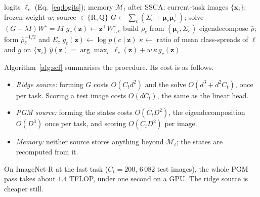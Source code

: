 \begin{algorithm}[t]
\caption{Statistics--classifier fusion at stage $t$ (inference only)}
\label{alg:scf}
\begin{algorithmic}[1]
\Require logits $\ell_c$ (Eq.~\ref{eq:logits}); memory $\mathcal M_t$ after SSCA;
  current-task images $\{\mathbf x_i\}$; frozen weight $w$; source $\in\{\mathrm R,\mathrm Q\}$
  \State $G\gets\sum_c(\Sigma_c+\boldsymbol\mu_c\boldsymbol\mu_c^{\top})$; solve $(G+\lambda I)W^\star=M$ 
  \State $g_c(\mathbf z)\gets\mathbf z^{\top}W^\star_{:,c}$
\Else
  \State build $\rho_c$ from $(\boldsymbol\mu_c,\Sigma_c)$ 
  \State eigendecompose $\bar\rho$; form $\bar\rho_\delta^{-1/2}$ and $E_c$ 
  \State $g_c(\mathbf z)\gets\log p(c\mid\mathbf z)$ 
\EndIf
\State $\kappa\gets$ ratio of mean class-spreads of $\ell$ and $g$ on $\{\mathbf x_i\}$ 
\State \Return $\hat y(\mathbf z)=\arg\max_c\,\ell_c(\mathbf z)+w\,\kappa\,g_c(\mathbf z)$
\end{algorithmic}
\end{algorithm}

Algorithm~\ref{alg:scf} summarises the procedure. Its cost is as follows.
\begin{itemize}
  \item \emph{Ridge source:} forming $G$ costs $O(C_td^2)$ and the solve
    $O(d^3+d^2C_t)$, once per task. Scoring a test image costs $O(dC_t)$, the
    same as the linear head.
  \item \emph{PGM source:} forming the states costs $O(C_tD^2)$, the
    eigendecomposition $O(D^3)$ once per task, and scoring $O(C_tD^2)$ per
    image.
  \item \emph{Memory:} neither source stores anything beyond $\mathcal M_t$;
    the states are recomputed from it.
\end{itemize}
On ImageNet-R at the last task ($C_t=200$, 6\,082 test images), the whole PGM
pass takes about $1.4$ TFLOP, under one second on a GPU. The ridge source is
cheaper still.
